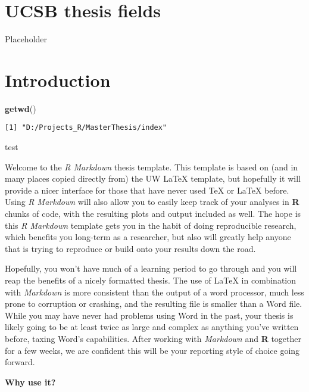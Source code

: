 \documentclass[twoside,12pt,final]{ucthesis-CA2012}
\newenvironment{Shaded}{}{}
\newcommand{\KeywordTok}[1]{\textcolor[rgb]{0.00,0.44,0.13}{\textbf{{#1}}}}
\newcommand{\NormalTok}[1]{{#1}}
\begin{document}
\begin{ucmainmatter}

\hypertarget{ucsb-thesis-fields}{%
\chapter{UCSB thesis fields}\label{ucsb-thesis-fields}}

Placeholder

\hypertarget{intro}{%
\chapter{Introduction}\label{intro}}
\begin{Shaded}
\begin{Highlighting}[]
\KeywordTok{getwd}\NormalTok{()}
\end{Highlighting}
\end{Shaded}
\begin{verbatim}
[1] "D:/Projects_R/MasterThesis/index"
\end{verbatim}
test

Welcome to the \emph{R Markdown} thesis template. This template is based on (and in many places copied directly from) the UW LaTeX template, but hopefully it will provide a nicer interface for those that have never used TeX or LaTeX before. Using \emph{R Markdown} will also allow you to easily keep track of your analyses in \textbf{R} chunks of code, with the resulting plots and output included as well. The hope is this \emph{R Markdown} template gets you in the habit of doing reproducible research, which benefits you long-term as a researcher, but also will greatly help anyone that is trying to reproduce or build onto your results down the road.

Hopefully, you won't have much of a learning period to go through and you will reap the benefits of a nicely formatted thesis. The use of LaTeX in combination with \emph{Markdown} is more consistent than the output of a word processor, much less prone to corruption or crashing, and the resulting file is smaller than a Word file. While you may have never had problems using Word in the past, your thesis is likely going to be at least twice as large and complex as anything you've written before, taxing Word's capabilities. After working with \emph{Markdown} and \textbf{R} together for a few weeks, we are confident this will be your reporting style of choice going forward.

\textbf{Why use it?}


\end{ucmainmatter}
\end{document}
